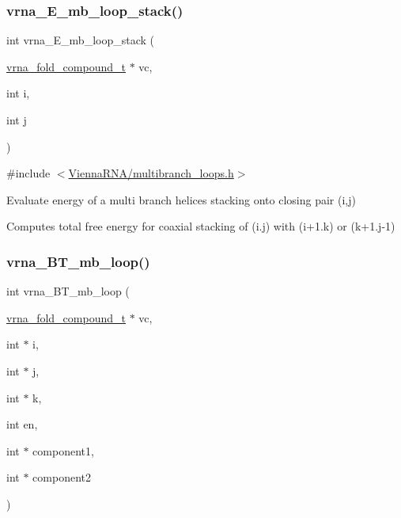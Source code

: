 \subsubsection{\texorpdfstring{vrna\+\_\+\+E\+\_\+mb\+\_\+loop\+\_\+stack()}{vrna\_E\_mb\_loop\_stack()}}
{\footnotesize\ttfamily int vrna\+\_\+\+E\+\_\+mb\+\_\+loop\+\_\+stack (\begin{DoxyParamCaption}\item[{\hyperlink{group__fold__compound_ga1b0cef17fd40466cef5968eaeeff6166}{vrna\+\_\+fold\+\_\+compound\+\_\+t} $\ast$}]{vc,  }\item[{int}]{i,  }\item[{int}]{j }\end{DoxyParamCaption})}



{\ttfamily \#include $<$\hyperlink{multibranch__loops_8h}{Vienna\+R\+N\+A/multibranch\+\_\+loops.\+h}$>$}



Evaluate energy of a multi branch helices stacking onto closing pair (i,j) 

Computes total free energy for coaxial stacking of (i.\+j) with (i+1.k) or (k+1.j-\/1) \mbox{\label{group__loops_ga9cb520ddfd8b3a48089a7910b045d06b}} 
\subsubsection{\texorpdfstring{vrna\+\_\+\+B\+T\+\_\+mb\+\_\+loop()}{vrna\_BT\_mb\_loop()}}
{\footnotesize\ttfamily int vrna\+\_\+\+B\+T\+\_\+mb\+\_\+loop (\begin{DoxyParamCaption}\item[{\hyperlink{group__fold__compound_ga1b0cef17fd40466cef5968eaeeff6166}{vrna\+\_\+fold\+\_\+compound\+\_\+t} $\ast$}]{vc,  }\item[{int $\ast$}]{i,  }\item[{int $\ast$}]{j,  }\item[{int $\ast$}]{k,  }\item[{int}]{en,  }\item[{int $\ast$}]{component1,  }\item[{int $\ast$}]{component2 }\end{DoxyParamCaption})}



